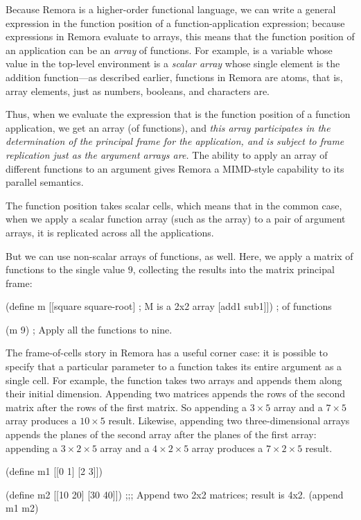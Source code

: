 
Because Remora is a higher-order functional language, 
we can write a general expression in the function position of 
a function-application expression;
because expressions in Remora evaluate to arrays,
this means that the function position of an application can be an
\emph{array} of functions.
For example,
\ex{+} is a variable whose value in the top-level environment
is a \emph{scalar array}
whose single element is the addition function---as described earlier,
functions in Remora are atoms, that is, array elements,
just as numbers, booleans, and characters are.

Thus, when we evaluate the expression that is the function position
of a function application, we get an array (of functions),
and \emph{this array participates in the determination of the principal frame
for the application, and is subject to frame replication
just as the argument arrays are.}
The ability to apply an array of different functions to an argument
gives Remora a MIMD-style capability to its parallel semantics.

The function position takes scalar cells,
which means that in the common case,
when we apply a scalar function array
(such as the \ex{+} array) to a pair of argument arrays,
it is replicated across all the applications.

But we can use non-scalar arrays of functions, as well.
Here, we apply a matrix of functions to the single value $9$,
collecting the results into the matrix principal frame:
\begin{code}
    (define m [[square  square-root] ; M is a 2x2 array
               [add1    sub1]])      ; of functions

    (m 9) ; Apply all the functions to nine.
\result{[[81 3]
 [10 8]]}\end{code}


The frame-of-cells story in Remora has a useful corner case:
it is possible to specify that a particular parameter to a function
takes its entire argument as a single cell.
For example, the  function takes two arrays
and appends them along their initial dimension.
Appending two matrices appends the rows of the second matrix
after the rows of the first matrix.
So appending a $3 \times 5$ array and a $7 \times 5$ array
produces a $10 \times 5$ result.
Likewise, appending two three-dimensional arrays appends the
planes of the second array after the planes of the first array:
appending a $3 \times 2 \times 5$ array and a $4 \times 2 \times 5$ array
produces a $7 \times 2 \times 5$ result.
\begin{code}
    (define m1 [[0  1]
                [2  3]])\pagebreak[0]

    (define m2 [[10 20]
                [30 40]])
\pagebreak[0]
    ;;; Append two 2x2 matrices; result is 4x2.
    (append m1 m2)
\pagebreak[0]
\result{[[0  1]
 [2  3]
 [10 20]
 [30 40]]}\end{code}

